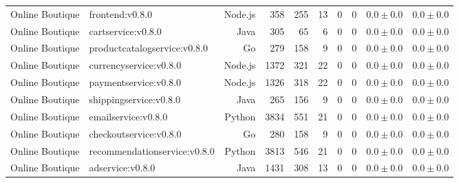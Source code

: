\begin{table}[htbp]
\begin{tabular}{llrrrrrrrr}
Online Boutique & frontend:v0.8.0 & Node.js & 358 & 255 & 13 & 0 & 0 & $0.0 \pm 0.0$ & $0.0 \pm 0.0$ \\
Online Boutique & cartservice:v0.8.0 & Java & 305 & 65 & 6 & 0 & 0 & $0.0 \pm 0.0$ & $0.0 \pm 0.0$ \\
Online Boutique & productcatalogservice:v0.8.0 & Go & 279 & 158 & 9 & 0 & 0 & $0.0 \pm 0.0$ & $0.0 \pm 0.0$ \\
Online Boutique & currencyservice:v0.8.0 & Node.js & 1372 & 321 & 22 & 0 & 0 & $0.0 \pm 0.0$ & $0.0 \pm 0.0$ \\
Online Boutique & paymentservice:v0.8.0 & Node.js & 1326 & 318 & 22 & 0 & 0 & $0.0 \pm 0.0$ & $0.0 \pm 0.0$ \\
Online Boutique & shippingservice:v0.8.0 & Java & 265 & 156 & 9 & 0 & 0 & $0.0 \pm 0.0$ & $0.0 \pm 0.0$ \\
Online Boutique & emailservice:v0.8.0 & Python & 3834 & 551 & 21 & 0 & 0 & $0.0 \pm 0.0$ & $0.0 \pm 0.0$ \\
Online Boutique & checkoutservice:v0.8.0 & Go & 280 & 158 & 9 & 0 & 0 & $0.0 \pm 0.0$ & $0.0 \pm 0.0$ \\
Online Boutique & recommendationservice:v0.8.0 & Python & 3813 & 546 & 21 & 0 & 0 & $0.0 \pm 0.0$ & $0.0 \pm 0.0$ \\
Online Boutique & adservice:v0.8.0 & Java & 1431 & 308 & 13 & 0 & 0 & $0.0 \pm 0.0$ & $0.0 \pm 0.0$ \\
\bottomrule
\end{tabular}
\end{table}